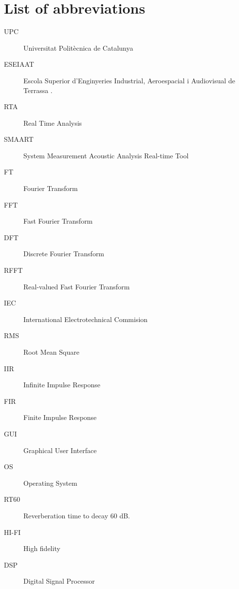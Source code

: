 \chapter*{List of abbreviations}

\begin{description}
	\item[UPC] Universitat Politècnica de Catalunya
	\item[ESEIAAT] Escola Superior d’Enginyeries Industrial, Aeroespacial i Audiovisual de Terrassa \cite{eseiaat}.
	\item[RTA] Real Time Analysis
	\item[SMAART] System Measurement Acoustic Analysis Real-time Tool
	\item[FT] Fourier Transform
	\item[FFT] Fast Fourier Transform
	\item[DFT] Discrete Fourier Transform
	\item[RFFT] Real-valued Fast Fourier Transform
	\item[IEC] International Electrotechnical Commision
	\item[RMS] Root Mean Square
	\item[IIR] Infinite Impulse Response
	\item[FIR] Finite Impulse Response
	\item[GUI] Graphical User Interface
	\item[OS] Operating System
	\item[RT60] Reverberation time to decay 60 dB.
	\item[HI-FI] High fidelity
	\item[DSP] Digital Signal Processor

\end{description}